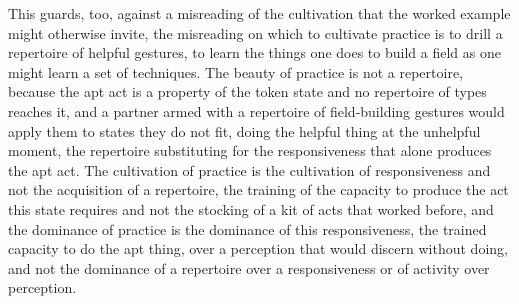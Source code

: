 This guards, too, against a misreading of the cultivation that the worked example might otherwise invite, the misreading on which to cultivate practice is to drill a repertoire of helpful gestures, to learn the things one does to build a field as one might learn a set of techniques. The beauty of practice is not a repertoire, because the apt act is a property of the token state and no repertoire of types reaches it, and a partner armed with a repertoire of field-building gestures would apply them to states they do not fit, doing the helpful thing at the unhelpful moment, the repertoire substituting for the responsiveness that alone produces the apt act. The cultivation of practice is the cultivation of responsiveness and not the acquisition of a repertoire, the training of the capacity to produce the act this state requires and not the stocking of a kit of acts that worked before, and the dominance of practice is the dominance of this responsiveness, the trained capacity to do the apt thing, over a perception that would discern without doing, and not the dominance of a repertoire over a responsiveness or of activity over perception.
